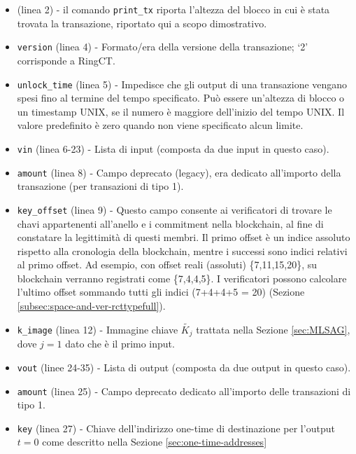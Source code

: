 \begin{appendices}
\begin{itemize}
    \item (linea 2) - il comando {\tt print\_tx} riporta l'altezza del blocco in cui è stata trovata la transazione, riportato qui a scopo dimostrativo.
	\item {\tt version} (linea 4) - Formato/era della versione della transazione; `2' corrisponde a RingCT.
	\item {\tt unlock\_time} (linea 5) - Impedisce che gli output di una transazione vengano spesi fino al termine del tempo specificato. Può essere un'altezza di blocco o un timestamp UNIX, se il numero è maggiore dell'inizio del tempo UNIX. Il valore predefinito è zero quando non viene specificato alcun limite.
	\item {\tt vin} (linea 6-23) - Lista di input (composta da due input in questo caso).
	\item {\tt amount} (linea 8) - Campo deprecato (legacy), era dedicato all'importo della transazione (per transazioni di tipo 1).
	\item {\tt key\_offset} (linea 9) - Questo campo consente ai verificatori di trovare le chavi appartenenti all'anello e i commitment nella blockchain, al fine di constatare la legittimità di questi membri. Il primo offset è un indice assoluto rispetto alla cronologia della blockchain, mentre i successi sono indici relativi al primo offset. Ad esempio, con offset reali (assoluti) \{7,11,15,20\}, su blockchain verranno registrati come \{7,4,4,5\}. I verificatori possono calcolare l'ultimo offset sommando tutti gli indici (7+4+4+5 = 20) (Sezione \ref{subsec:space-and-ver-rcttypefull}).
	\item {\tt k\_image} (linea 12) - Immagine chiave \(\tilde{K_j}\) trattata nella Sezione \ref{sec:MLSAG}, dove $j = 1$ dato che è il primo input.
	\item {\tt vout} (linee 24-35) - Lista di output (composta da due output in questo caso).
	\item {\tt amount} (linea 25) - Campo deprecato dedicato all'importo delle transazioni di tipo 1.
	\item {\tt key} (linea 27) - Chiave dell'indirizzo one-time di destinazione per l'output $t = 0$ come descritto nella Sezione \ref{sec:one-time-addresses}

\end{itemize}
\end{appendices}
